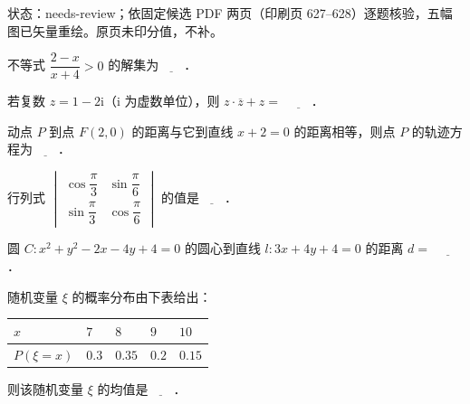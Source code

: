

状态：needs-review；依固定候选 PDF 两页（印刷页 627–628）逐题核验，五幅图已矢量重绘。原页未印分值，不补。


\begin{question}
不等式 $\dfrac{2-x}{x+4}>0$ 的解集为$\underline{\qquad}$．

\end{question}
\begin{question}
若复数 $z=1-2\mathrm i$（$\mathrm i$ 为虚数单位），则 $z\cdot\overline z+z=$ $\underline{\qquad}$．

\end{question}
\begin{question}
动点 $P$ 到点 $F(2,0)$ 的距离与它到直线 $x+2=0$ 的距离相等，则点 $P$ 的轨迹方程为$\underline{\qquad}$．

\end{question}
\begin{question}
行列式 $\begin{vmatrix}\cos\dfrac\pi3&\sin\dfrac\pi6\\ \sin\dfrac\pi3&\cos\dfrac\pi6\end{vmatrix}$ 的值是$\underline{\qquad}$．

\end{question}
\begin{question}
圆 $C:x^2+y^2-2x-4y+4=0$ 的圆心到直线 $l:3x+4y+4=0$ 的距离 $d=$ $\underline{\qquad}$．

\end{question}
\begin{question}
随机变量 $\xi$ 的概率分布由下表给出：

\begin{center}
\begin{tabular}{lllll}
\toprule
$x$ & $7$ & $8$ & $9$ & $10$ \\
\midrule
$P(\xi=x)$ & $0.3$ & $0.35$ & $0.2$ & $0.15$ \\
\bottomrule
\end{tabular}
\end{center}

则该随机变量 $\xi$ 的均值是$\underline{\qquad}$．

\Needspace{0.4\textheight}
\end{question}

